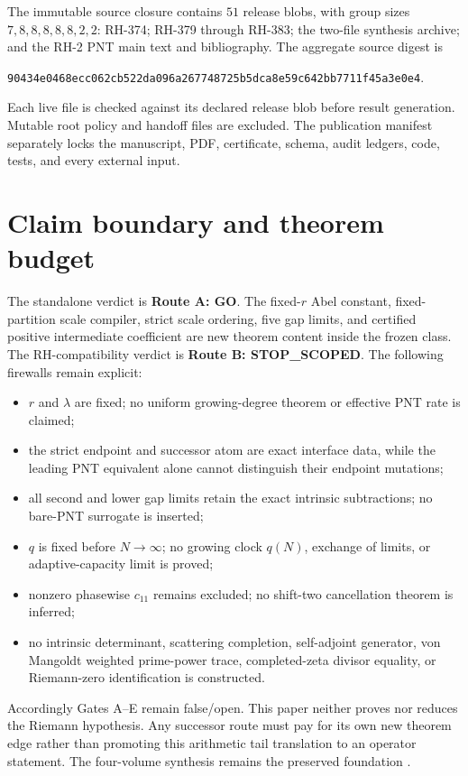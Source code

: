 \documentclass[11pt]{article}
\theoremstyle{definition}
\theoremstyle{remark}
\begin{document}
The immutable source closure contains $51$ release blobs, with group sizes
$7,8,8,8,8,8,2,2$: RH-374; RH-379 through RH-383; the two-file synthesis
archive; and the RH-2 PNT main text and bibliography.  The aggregate source
digest is
\begin{center}
\texttt{90434e0468ecc062cb522da096a267748725b5dca8e59c642bb7711f45a3e0e4}.
\end{center}
Each live file is checked against its declared release blob before result
generation.  Mutable root policy and handoff files are excluded.  The
publication manifest separately locks the manuscript, PDF, certificate,
schema, audit ledgers, code, tests, and every external input.

\section{Claim boundary and theorem budget}

The standalone verdict is \textbf{Route A: GO}.  The fixed-$r$ Abel
constant, fixed-partition scale compiler, strict scale ordering, five gap
limits, and certified positive intermediate coefficient are new theorem
content inside the frozen class.  The RH-compatibility verdict is
\textbf{Route B: STOP\_SCOPED}.  The following firewalls remain explicit:
\begin{itemize}[leftmargin=2em]
 \item $r$ and $\lambda$ are fixed; no uniform growing-degree theorem or
       effective PNT rate is claimed;
 \item the strict endpoint and successor atom are exact interface data,
       while the leading PNT equivalent alone cannot distinguish their
       endpoint mutations;
 \item all second and lower gap limits retain the exact intrinsic
       subtractions; no bare-PNT surrogate is inserted;
 \item $q$ is fixed before $N\to\infty$; no growing clock $q(N)$, exchange
       of limits, or adaptive-capacity limit is proved;
 \item nonzero phasewise $c_{11}$ remains excluded; no shift-two
       cancellation theorem is inferred;
 \item no intrinsic determinant, scattering completion, self-adjoint
       generator, von Mangoldt weighted prime-power trace, completed-zeta
       divisor equality, or Riemann-zero identification is constructed.
\end{itemize}
Accordingly Gates A--E remain false/open.  This paper neither proves nor
reduces the Riemann hypothesis.  Any successor route must pay for its own
new theorem edge rather than promoting this arithmetic tail translation to
an operator statement.  The four-volume synthesis remains the preserved
foundation \citep{RHMVP2}.
\end{document}
